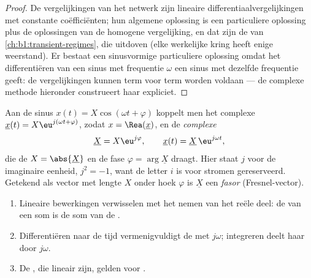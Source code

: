 \begin{proof}
De vergelijkingen van het netwerk zijn lineaire differentiaalvergelijkingen met
constante coëfficiënten; hun algemene oplossing is een particuliere oplossing plus de
oplossingen van de homogene vergelijking, en dat zijn de  van
\cref{ch:b1:transient-regimes}, die uitdoven (elke werkelijke kring heeft enige
weerstand). Er bestaat een sinusvormige particuliere oplossing omdat het
differentiëren van een sinus met frequentie $\omega$ een sinus met
dezelfde frequentie geeft: de vergelijkingen kunnen term voor term worden voldaan --- de
complexe methode hieronder construeert haar expliciet.
\end{proof}

\begin{definition}\label{def:b1:sinusoidal-impedance:complex}
Aan de sinus $x(t) = X\cos(\omega t + \varphi)$ koppelt men het
complexe  $\underline{x}(t) = X\eu^{j(\omega t + \varphi)}$, zodat
$x = \Rea(\underline{x})$, en de \emph{complexe }
\[
\underline{X} = X\eu^{j\varphi}, \qquad \underline{x}(t) = \underline{X}\,\eu^{j\omega t},
\]
die de  $X = \abs{\underline{X}}$ en de fase
$\varphi = \arg\underline{X}$ draagt. Hier staat $j$ voor de imaginaire eenheid,
$j^2 = -1$, want de letter $i$ is voor stromen gereserveerd. Getekend als
vector met lengte $X$ onder hoek $\varphi$ is $\underline{X}$ een
\emph{fasor} (Fresnel-vector).
\end{definition}

\begin{proposition}\label{prop:b1:sinusoidal-impedance:rules}
\begin{enumerate}
  \item Lineaire bewerkingen verwisselen met het nemen van het reële deel: de
         van een som is de som van de .
  \item Differentiëren naar de tijd vermenigvuldigt de  met $j\omega$; integreren deelt haar door $j\omega$.
  \item De , die lineair zijn, gelden voor .
\end{enumerate}
\end{proposition}

